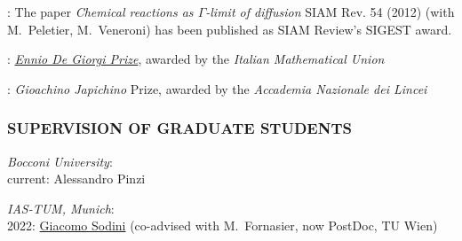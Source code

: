 \documentclass[reqno,11pt]{article}
\let\mysec\subsubsection
\newcommand{\npind}{\hangindent\parindent
  \noindent}
\let\mysec\subsubsection
\newcommand{\switch}[2]{\iflanguage{italian}{#1}{#2}}
\theoremstyle{plain}
\begin{document}
\hangindent \parindent
{}: The paper \emph{Chemical reactions as $\Gamma$-limit of
    diffusion}
  SIAM Rev. 54 (2012) (with M.~Peletier, M.~Veneroni) 
  has been published as SIAM Review’s SIGEST award.

\hangindent \parindent
{}: 
\href{https://umi.dm.unibo.it/premi-old/premio-ennio-de-giorgi/}{\emph{Ennio De Giorgi Prize}},
  awarded by the
\emph{Italian Mathematical Union}



\hangindent \parindent
{}: 
\emph{Gioachino Japichino} Prize, awarded by
the
\emph{Accademia Nazionale dei Lincei} 









\mysec*{SUPERVISION OF GRADUATE STUDENTS}


\hangindent \parindent
\noindent \emph{Bocconi University}:\\
current: Alessandro Pinzi

\hangindent \parindent
\noindent \emph{IAS-TUM, Munich}:\\
2022: \href{https://sites.google.com/view/giacomoenricosodini}{Giacomo
Sodini}
(co-advised with M.~Fornasier,
now PostDoc, TU Wien)
\end{document}
